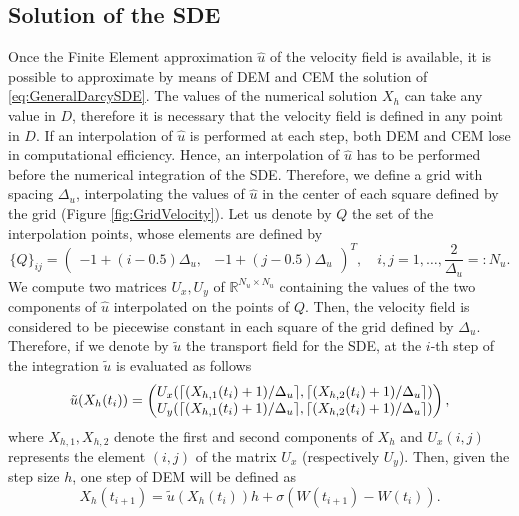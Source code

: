 \subsection{Solution of the SDE}

Once the Finite Element approximation $\hat{u}$ of the velocity field is available, it is possible to approximate by means of DEM and CEM the solution of \eqref{eq:GeneralDarcySDE}. The values of the numerical solution $X_h$ can take any value in $D$, therefore it is necessary that the velocity field is defined in any point in $D$. If an interpolation of $\hat{u}$ is performed at each step, both DEM and CEM lose in computational efficiency. Hence, an interpolation of $\hat{u}$ has to be performed before the numerical integration of the SDE. Therefore, we define a grid with spacing $\Delta_u$, interpolating the values of $\hat{u}$ in the center of each square defined by the grid (Figure \ref{fig:GridVelocity}). Let us denote by $Q$ the set of the interpolation points, whose elements are defined by
\begin{equation}\label{eq:InterpMatrix}
	\{Q\}_{ij} = \begin{pmatrix} -1 + (i-0.5)\Delta_u, & -1 + (j-0.5)\Delta_u \end{pmatrix}^T, \quad i,j = 1, \dots, \frac{2}{\Delta_u} =: N_u.
\end{equation}
We compute two matrices $U_x, U_y$ of $\mathbb{R}^{N_u \times N_u}$ containing the values of the two components of $\hat{u}$ interpolated on the points of $Q$. Then, the velocity field is considered to be piecewise constant in each square of the grid defined by $\Delta_u$. Therefore, if we denote by $\tilde{u}$ the transport field for the SDE, at the $i$-th step of the integration $\tilde{u}$ is evaluated as follows
\begin{equation}\label{eq:VelEval}
	\tilde{u}(X_h(t_i)) = \begin{pmatrix}	U_x(\lceil(X_{h,1}(t_i)+1)/\Delta_u\rceil,\lceil(X_{h,2}(t_i)+1)/\Delta_u\rceil) \\
					U_y(\lceil(X_{h,1}(t_i)+1)/\Delta_u\rceil,\lceil(X_{h,2}(t_i)+1)/\Delta_u\rceil) \end{pmatrix},
\end{equation}
where $X_{h,1}, X_{h,2}$ denote the first and second components of $X_h$ and $U_x(i,j)$ represents the element $(i,j)$ of the matrix $U_x$ (respectively $U_y$). Then, given the step size $h$, one step of DEM will be defined as
\begin{equation}\label{eq:DEMDarcy}
	X_h(t_{i+1}) = \tilde{u}(X_h(t_i)) h + \sigma (W(t_{i+1}) - W(t_i)).
\end{equation}

